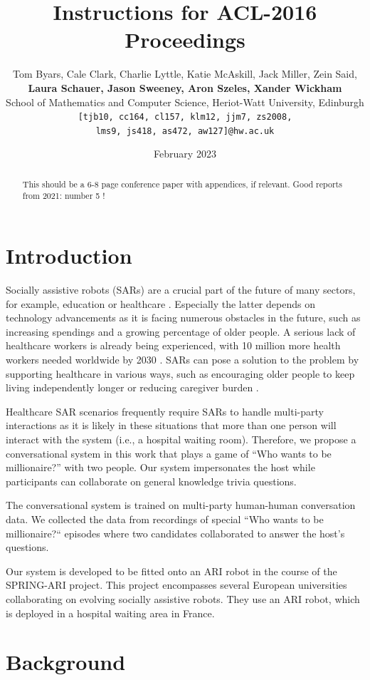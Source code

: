\documentclass[hidelinks, 11pt]{article}
\title{Instructions for ACL-2016 Proceedings}
\author{Tom Byars, Cale Clark, Charlie Lyttle, Katie McAskill, Jack Miller, Zein Said, \\
{\bf Laura Schauer, Jason Sweeney, Aron Szeles, Xander Wickham} \\
School of Mathematics and Computer Science, Heriot-Watt University, Edinburgh \\ {\tt {[tjb10, cc164, cl157, klm12, jjm7, zs2008,}} \\ {\tt {lms9, js418, as472, aw127]}@hw.ac.uk}}
\date{February 2023}
\begin{document}
\maketitle
\begin{abstract}
  This should be a 6-8 page conference paper with appendices, if relevant.
  Good reports from 2021: number 5 !
\end{abstract}


\section{Introduction}
\label{sec:introduction}

Socially assistive robots (SARs) are a crucial part of the future of many sectors, for example, education or healthcare \cite{gunson_visually_aware_2022}. Especially the latter depends on technology advancements as it is facing numerous obstacles in the future, such as increasing spendings and a growing percentage of older people. A serious lack of healthcare workers is already being experienced, with 10 million more health workers needed worldwide by 2030 \cite{cooper_ari_2020,Health_workforce_2023}. SARs can pose a solution to the problem by supporting healthcare in various ways, such as encouraging older people to keep living independently longer or reducing caregiver burden \cite{cooper_ari_2020}.

Healthcare SAR scenarios frequently require SARs to handle multi-party interactions as it is likely in these situations that more than one person will interact with the system (i.e., a hospital waiting room). Therefore, we propose a conversational system in this work that plays a game of ``Who wants to be millionaire?'' with two people. Our system impersonates the host while participants can collaborate on general knowledge trivia questions.

The conversational system is trained on multi-party human-human conversation data. We collected the data from recordings of special “Who wants to be millionaire?“ episodes where two candidates collaborated to answer the host's questions.

Our system is developed to be fitted onto an ARI robot in the course of the SPRING-ARI project. This project encompasses several European universities collaborating on evolving socially assistive robots. They use an ARI robot, which is deployed in a hospital waiting area in France.

\section{Background}
\label{sec:background}
\end{document}
